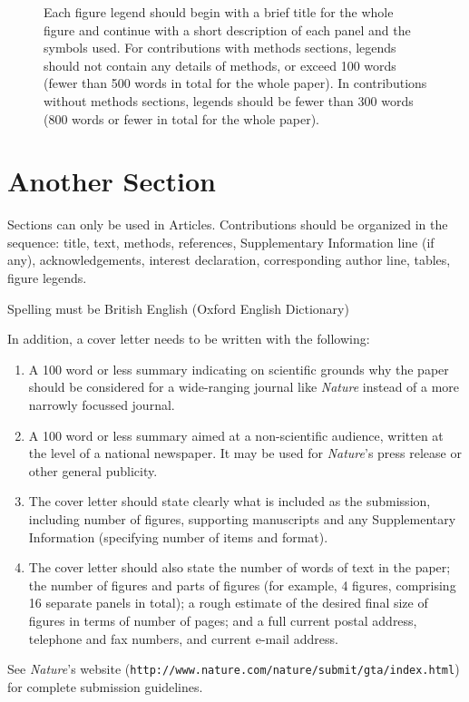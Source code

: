 \documentclass{nature}
\begin{document}
\begin{figure}
\caption{Each figure legend should begin with a brief title for
the whole figure and continue with a short description of each
panel and the symbols used. For contributions with methods
sections, legends should not contain any details of methods, or
exceed 100 words (fewer than 500 words in total for the whole
paper). In contributions without methods sections, legends should
be fewer than 300 words (800 words or fewer in total for the whole
paper).}
\end{figure}

\section*{Another Section}

Sections can only be used in Articles.  Contributions should be
organized in the sequence: title, text, methods, references,
Supplementary Information line (if any), acknowledgements,
interest declaration, corresponding author line, tables, figure
legends.

Spelling must be British English (Oxford English Dictionary)

In addition, a cover letter needs to be written with the
following:
\begin{enumerate}
 \item A 100 word or less summary indicating on scientific grounds
why the paper should be considered for a wide-ranging journal like
\textsl{Nature} instead of a more narrowly focussed journal.
 \item A 100 word or less summary aimed at a non-scientific audience,
written at the level of a national newspaper.  It may be used for
\textsl{Nature}'s press release or other general publicity.
 \item The cover letter should state clearly what is included as the
submission, including number of figures, supporting manuscripts
and any Supplementary Information (specifying number of items and
format).
 \item The cover letter should also state the number of
words of text in the paper; the number of figures and parts of
figures (for example, 4 figures, comprising 16 separate panels in
total); a rough estimate of the desired final size of figures in
terms of number of pages; and a full current postal address,
telephone and fax numbers, and current e-mail address.
\end{enumerate}

See \textsl{Nature}'s website
(\texttt{http://www.nature.com/nature/submit/gta/index.html}) for
complete submission guidelines.
\end{document}
